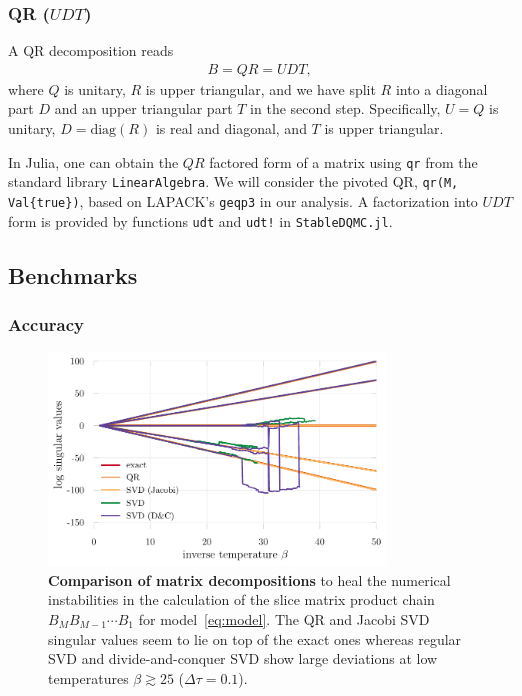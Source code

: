 \documentclass[submission, Phys]{SciPost}
\begin{document}
\subsubsection{QR ($UDT$)}
A QR decomposition reads
\begin{align}
	B = QR = UDT,
\end{align}
where $Q$ is unitary, $R$ is upper triangular, and we have split $R$ into a diagonal part $D$ and an upper triangular part $T$ in the second step. Specifically, $U = Q$ is unitary, $D = \textrm{diag}(R)$ is real and diagonal, and $T$ is upper triangular.

In Julia, one can obtain the $QR$ factored form of a matrix using \texttt{qr} from the standard library \texttt{LinearAlgebra}. We will consider the pivoted QR, \texttt{qr(M, Val\{true\})}, based on LAPACK's \texttt{geqp3} in our analysis. A factorization into $UDT$ form is provided by functions \texttt{udt} and \texttt{udt!} in \texttt{StableDQMC.jl}.


\subsection{Benchmarks}

\subsubsection{Accuracy}
\begin{figure}
	\centering
	\includegraphics[width=0.8\textwidth]{figures/decomp_comparison_simple.pdf}
	\caption{\textbf{Comparison of matrix decompositions} to heal the numerical instabilities in the calculation of the slice matrix product chain $B_M B_{M-1} \cdots B_1$ for model~\eqref{eq:model}. The QR and Jacobi SVD singular values seem to lie on top of the exact ones whereas regular SVD and divide-and-conquer SVD show large deviations at low temperatures $\beta \gtrsim 25$ ($\Delta \tau = 0.1$).}
	\label{fig:decomp_comparison_simple}
\end{figure}
\end{document}
